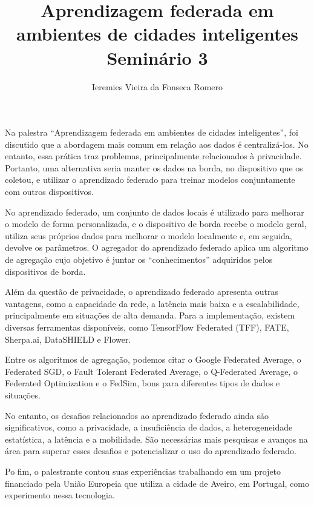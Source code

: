 \documentclass[11pt]{article}
\author{Ieremies Vieira da Fonseca Romero}
\date{}
\title{Aprendizagem federada em ambientes de cidades inteligentes\\\medskip
\large Seminário 3}
\begin{document}
\maketitle
Na palestra ``Aprendizagem federada em ambientes de cidades inteligentes'', foi discutido que a abordagem mais comum em relação aos dados é centralizá-los. No entanto, essa prática traz problemas, principalmente relacionados à privacidade. Portanto, uma alternativa seria manter os dados na borda, no dispositivo que os coletou, e utilizar o aprendizado federado para treinar modelos conjuntamente com outros dispositivos.

No aprendizado federado, um conjunto de dados locais é utilizado para melhorar o modelo de forma personalizada, e o dispositivo de borda recebe o modelo geral, utiliza seus próprios dados para melhorar o modelo localmente e, em seguida, devolve os parâmetros. O agregador do aprendizado federado aplica um algoritmo de agregação cujo objetivo é juntar os ``conhecimentos'' adquiridos pelos dispositivos de borda.

Além da questão de privacidade, o aprendizado federado apresenta outras vantagens, como a capacidade da rede, a latência mais baixa e a escalabilidade, principalmente em situações de alta demanda. Para a implementação, existem diversas ferramentas disponíveis, como TensorFlow Federated (TFF), FATE, Sherpa.ai, DataSHIELD e Flower.

Entre os algoritmos de agregação, podemos citar o Google Federated Average, o Federated SGD, o Fault Tolerant Federated Average, o Q-Federated Average, o Federated Optimization e o FedSim, bons para diferentes tipos de dados e situações.

No entanto, os desafios relacionados ao aprendizado federado ainda são significativos, como a privacidade, a insuficiência de dados, a heterogeneidade estatística, a latência e a mobilidade. São necessárias mais pesquisas e avanços na área para superar esses desafios e potencializar o uso do aprendizado federado.

Po fim, o palestrante contou suas experiências trabalhando em um projeto financiado pela União Europeia que utiliza a cidade de Aveiro, em Portugal, como experimento nessa tecnologia.
\end{document}
